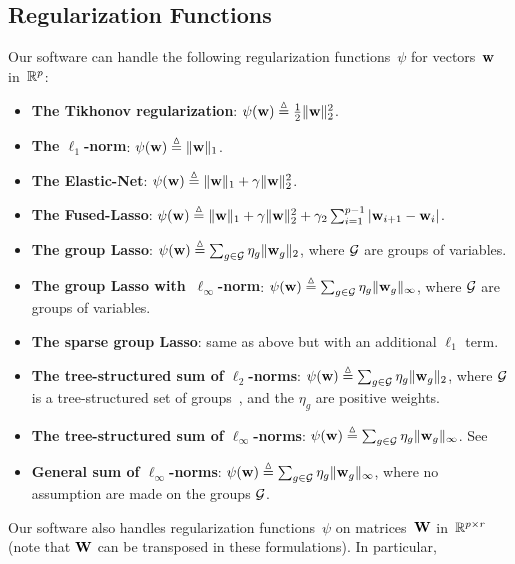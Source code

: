 \documentclass[a4paper, 11pt]{article}
\begin{document}
\subsection{Regularization Functions}
Our software can handle the following regularization functions~$\psi$ for vectors~${\mathbf w}$ in~${\mathbb R}^p$:
\begin{itemize}
\item \textbf{The Tikhonov regularization}: $\psi({\mathbf w}) \stackrel{\vartriangle}{=} \frac{1}{2}\|{\mathbf w}\|_2^2$.
\item \textbf{The $\ell_1$-norm}: $\psi({\mathbf w}) \stackrel{\vartriangle}{=} \|{\mathbf w}\|_1$.
\item \textbf{The Elastic-Net}: $\psi({\mathbf w}) \stackrel{\vartriangle}{=} \|{\mathbf w}\|_1+\gamma\|{\mathbf w}\|_2^2$.
\item \textbf{The Fused-Lasso}: $\psi({\mathbf w}) \stackrel{\vartriangle}{=} \|{\mathbf w}\|_1+\gamma\|{\mathbf w}\|_2^2+\gamma_2\sum_{i=1}^{p-1}|{\mathbf w}_{i+1}-{\mathbf w}_i|$.
\item \textbf{The group Lasso}: $\psi({\mathbf w}) \stackrel{\vartriangle}{=} \sum_{g \in {\mathcal G}} \eta_g \|{\mathbf w}_g\|_2$, where ${\mathcal G}$ are groups of variables.
\item \textbf{The group Lasso with~$\ell_\infty$-norm}: $\psi({\mathbf w}) \stackrel{\vartriangle}{=} \sum_{g \in {\mathcal G}} \eta_g \|{\mathbf w}_g\|_\infty$, where ${\mathcal G}$ are groups of variables.
\item \textbf{The sparse group Lasso}: same as above but with an additional $\ell_1$ term.
\item \textbf{The tree-structured sum of $\ell_2$-norms}: $\psi({\mathbf w}) \stackrel{\vartriangle}{=} \sum_{g \in {\mathcal G}} \eta_g \|{\mathbf w}_g\|_2$, where ${\mathcal G}$ is a tree-structured set of groups~\cite{jenatton3}, and the $\eta_g$ are positive weights.
\item \textbf{The tree-structured sum of $\ell_\infty$-norms}: $\psi({\mathbf w}) \stackrel{\vartriangle}{=} \sum_{g \in {\mathcal G}} \eta_g \|{\mathbf w}_g\|_\infty$. See \cite{jenatton3}
\item \textbf{General sum of $\ell_\infty$-norms}:  $\psi({\mathbf w}) \stackrel{\vartriangle}{=} \sum_{g \in {\mathcal G}} \eta_g \|{\mathbf w}_g\|_\infty$, where no assumption are made on the groups ${\mathcal G}$.
\end{itemize}
Our software also handles regularization functions~$\psi$ on matrices~${\mathbf W}$ in~${\mathbb R}^{p \times r}$ (note that ${\mathbf W}$ can be transposed in these formulations). In particular,
\end{document}
